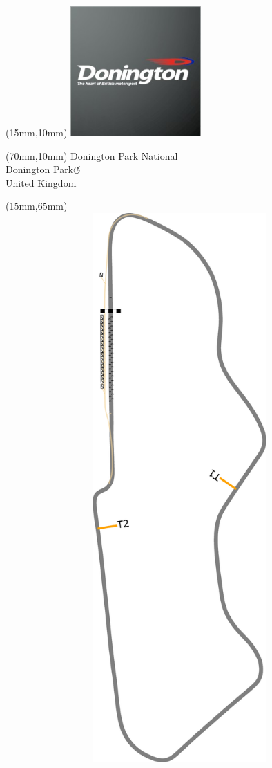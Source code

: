 \null\newpage
\begin{textblock*}{50mm}(15mm,10mm)%
\includegraphics[width=50mm]{LG/2015-05-20_00080.png}
\end{textblock*}
\begin{textblock*}{130mm}(70mm,10mm)%
{\fontsize{20}{20}\selectfont Donington Park National\\}
{\fontsize{16}{16}\selectfont Donington Park\hfill \huge$\circlearrowleft$\\}
{\fontsize{12}{12}\selectfont United Kingdom\\}
\end{textblock*}
\begin{textblock*}{185mm}(15mm,65mm)%
\centering
\mbox{\includegraphics[width=185mm,height=210mm,keepaspectratio]{PT/DOPANA.pdf}}
\end{textblock*}
